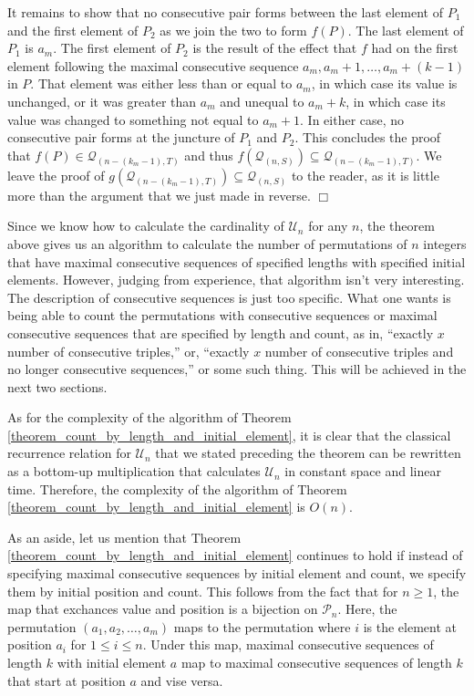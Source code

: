\documentclass{article}
\def\endproof{\mbox{$\Box$} \par }     %
\begin{document}
It remains to show that no consecutive pair forms between the last element of $P_1$ and the first element of
$P_2$ as we join the two to form $f(P)$. The last element of $P_1$ is $a_m$. The first element of $P_2$ is
the result of the effect that $f$ had on the first element following the maximal consecutive sequence
$a_m, a_m + 1, \ldots, a_m + (k -1)$ in $P$. That element was either less than or equal to $a_m$, in which
case its value is unchanged, or it was greater than $a_m$ and unequal to $a_m + k$, in which case its value
was changed to something not equal to $a_m + 1$. In either case, no consecutive pair forms at the juncture
of $P_1$ and $P_2$. This concludes the proof that $f(P)\in {\mathcal Q}_{(n-(k_m-1),T)}$ and thus
$f({\mathcal Q}_{(n,S)}) \subseteq {\mathcal Q}_{(n-(k_m-1),T)}$. We leave the proof of
$g({\mathcal Q}_{(n-(k_m-1),T)}) \subseteq {\mathcal Q}_{(n,S)}$ to the reader, as it is little more than
the argument that we just made in reverse.
\endproof

Since we know how to calculate the cardinality of ${\mathcal U}_n$ for any $n$, the theorem above gives
us an algorithm to calculate the number of permutations of $n$ integers that have maximal consecutive
sequences of specified lengths with specified initial elements. However, judging from experience, that algorithm
isn't very interesting. The description of consecutive sequences is just too specific. What one wants
is being able to count the permutations with consecutive sequences or maximal consecutive sequences that
are specified by length and count, as in, ``exactly $x$ number of consecutive triples,'' or, ``exactly
$x$ number of consecutive triples and no longer consecutive sequences,'' or some such thing. This will
be achieved in the next two sections.

As for the complexity of the algorithm of Theorem \ref{theorem_count_by_length_and_initial_element},
it is clear that the classical recurrence relation for ${\mathcal U}_n$ that we stated preceding the
theorem can be rewritten as a bottom-up multiplication that calculates ${\mathcal U}_n$ in constant
space and linear time. Therefore, the complexity of the algorithm of
Theorem \ref{theorem_count_by_length_and_initial_element} is $O(n)$.

As an aside, let us mention that Theorem \ref{theorem_count_by_length_and_initial_element} continues
to hold if instead of specifying maximal consecutive sequences by initial element and count, we specify
them by initial position and count. This follows from the fact that for $n\geq 1$,
the map that exchances value and position is a bijection on ${\mathcal P}_n$. Here, the permutation
$(a_1, a_2, \ldots, a_m)$ maps to the permutation where $i$ is the element at position $a_i$ for $1 \leq i\leq n$. 
Under this map, maximal consecutive sequences of length $k$ with initial element $a$ map to maximal
consecutive sequences of length $k$ that start at position $a$ and vise versa.
\end{document}
